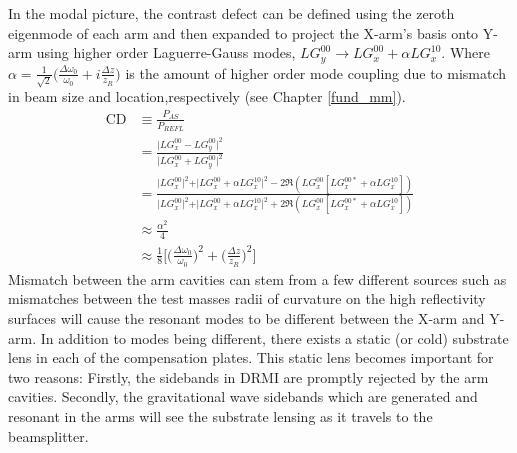 	In the modal picture, the contrast defect can be defined using the zeroth eigenmode of each arm and then expanded to project the X-arm's basis onto Y-arm using higher order Laguerre-Gauss modes, $LG^{00}_y \rightarrow  LG^{00}_x + \alpha LG^{10}_x$. Where $\alpha = \frac{1}{\sqrt{2}} \big(\frac{\Delta \omega_{0}}{\omega_{0}} + i \frac{\Delta z }{z_R}\big)$ is the amount of higher order mode coupling due to mismatch in beam size and location,respectively (see Chapter \ref{fund_mm}).
	\begin{equation}\label{CD_mode}
	\begin{aligned}
	\text{CD} 	&\equiv \frac{P_{AS}}{P_{REFL}} \\
				&= \frac{\vert LG^{00}_x - LG^{00}_y \vert^2}{\vert LG^{00}_x + LG^{00}_y \vert^2}\\
				&= \frac{\vert LG^{00}_x \vert^2 + \vert LG^{00}_x + \alpha LG^{10}_x \vert^2 - 2\Re(LG^{00}_x [LG^{00*}_x + \alpha LG^{10}_x ])}{\vert LG^{00}_x \vert^2 + \vert LG^{00}_x + \alpha LG^{10}_x \vert^2 + 2\Re(LG^{00}_x [LG^{00*}_x + \alpha LG^{10}_x ])}\\
				&\approx \frac{\alpha^2}{4}\\
				&\approx \frac{1}{8} \bigg[ \bigg(\frac{\Delta\omega_{0}}{\omega_{0}} \bigg)^2+  \bigg(\frac{ \Delta z }{z_R}\bigg)^2 \bigg]
	\end{aligned}
	\end{equation}
	Mismatch between the arm cavities can stem from a few different sources such as mismatches between the test masses radii of curvature on the high reflectivity surfaces will cause the resonant modes to be different between the X-arm and Y-arm.
	In addition to modes being different, there exists a static (or cold) substrate lens in each of the compensation plates.
	This static lens becomes important for two reasons: Firstly, the sidebands in DRMI are promptly rejected by the arm cavities. Secondly, the gravitational wave sidebands which are generated and resonant in the arms will see the substrate lensing as it travels to the beamsplitter.
	
